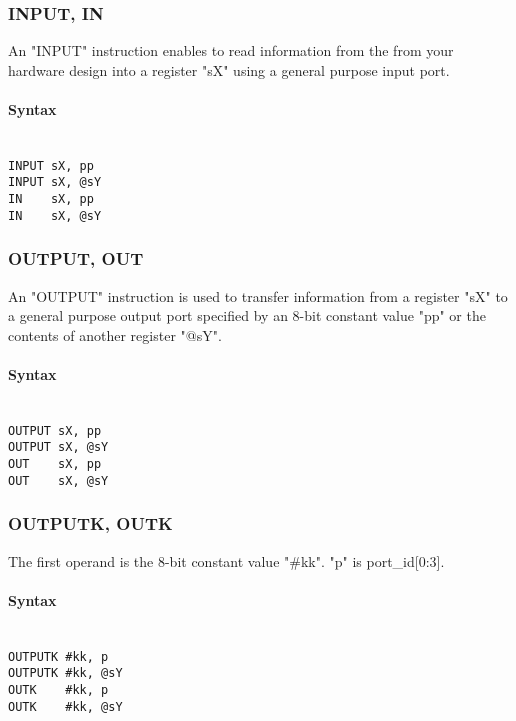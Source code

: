         \subsubsection{INPUT, IN}
            An "INPUT" instruction enables to read information from the from your hardware design into a register "sX" using a general purpose input port.

            \paragraph{Syntax}
                ~\\
                \verb'INPUT sX, pp'\\
                \verb'INPUT sX, @sY'\\
                \verb'IN    sX, pp'\\
                \verb'IN    sX, @sY'

        \subsubsection{OUTPUT, OUT}
            An "OUTPUT" instruction is used to transfer information from a register "sX" to a general purpose output port specified by an 8-bit constant value "pp" or the
            contents of another register "@sY".

            \paragraph{Syntax}
                ~\\
                \verb'OUTPUT sX, pp'\\
                \verb'OUTPUT sX, @sY'\\
                \verb'OUT    sX, pp'\\
                \verb'OUT    sX, @sY'

        \subsubsection{OUTPUTK, OUTK}
            The first operand is the 8-bit constant value "\#kk". "p" is port\_id[0:3].

            \paragraph{Syntax}
                ~\\
                \verb'OUTPUTK #kk, p'\\
                \verb'OUTPUTK #kk, @sY'\\
                \verb'OUTK    #kk, p'\\
                \verb'OUTK    #kk, @sY'
